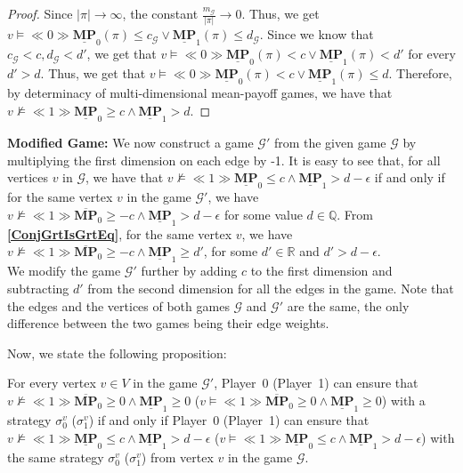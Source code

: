 \begin{proof}
    Since $|\pi| \to \infty$, the constant $\frac{m_\mathcal{G}}{|\pi|} \to 0$. Thus, we get $v \models \ll 0 \gg \underline{\mathbf{MP}}_0(\pi) \leqslant c_\mathcal{G} \lor \underline{\mathbf{MP}}_1(\pi) \leqslant d_\mathcal{G}$. Since we know that $c_\mathcal{G} < c, d_\mathcal{G} < d'$, we get that $v \models \ll 0 \gg \underline{\mathbf{MP}}_0(\pi) < c \lor \underline{\mathbf{MP}}_1(\pi) < d'$ for every $d' > d$. Thus, we get that  $v \models \ll 0 \gg \underline{\mathbf{MP}}_0(\pi) < c \lor \underline{\mathbf{MP}}_1(\pi) \leqslant d$. Therefore, by determinacy of multi-dimensional mean-payoff games, we have that $v \nvDash \ll 1 \gg \underline{\mathbf{MP}}_0 \geqslant c \land \underline{\mathbf{MP}}_1 > d$.
\end{proof}

\textbf{Modified Game:} We now construct a game $\mathcal{G'}$ from the given game $\mathcal{G}$ by multiplying the first dimension on each edge by -1. It is easy to see that, for all vertices $v$ in $\mathcal{G}$, we have that $v \nvDash \ll 1 \gg \underline{\mathbf{MP}}_0 \leqslant c \land \underline{\mathbf{MP}}_1 > d-\epsilon$ if and only if for the same vertex $v$ in the game $\mathcal{G'}$, we have $v \nvDash \ll 1 \gg \overline{\mathbf{MP}}_0 \geqslant -c \land \underline{\mathbf{MP}}_1 > d-\epsilon$ for some value $d \in \mathbb{Q}$. From \textbf{\cref{ConjGrtIsGrtEq}}, for the same vertex $v$, we have $v \nvDash \ll 1 \gg \overline{\mathbf{MP}}_0 \geqslant -c \land \underline{\mathbf{MP}}_1 \geqslant d'$, for some $d' \in \mathbb{R}$ and $d' > d - \epsilon$. \\ \noindent
We modify the game $\mathcal{G'}$ further by adding $c$ to the first dimension and subtracting $d'$ from the second dimension for all the edges in the game. Note that the edges and the vertices of both games $\mathcal{G}$ and $\mathcal{G'}$ are the same, the only difference between the two games being their edge weights.

\noindent Now, we state the following proposition:
\begin{proposition}
    \label{PropGamStrEqNewGamStr}
    For every vertex $v \in V$ in the game $\mathcal{G'}$, Player~0 (Player~1) can ensure that $v \nvDash \ll 1 \gg \overline{\mathbf{MP}}_0 \geqslant 0 \land \underline{\mathbf{MP}}_1 \geqslant 0$ ($v \models \ll 1 \gg \overline{\mathbf{MP}}_0 \geqslant 0 \land \underline{\mathbf{MP}}_1 \geqslant 0$) with a strategy $\sigma_0^{v}$ ($\sigma_1^{v}$) if and only if Player~0 (Player~1) can ensure that $v \nvDash \ll 1 \gg \underline{\mathbf{MP}}_0 \leqslant c \land \underline{\mathbf{MP}}_1 > d-\epsilon$ ($v \models \ll 1 \gg \underline{\mathbf{MP}}_0 \leqslant c \land \underline{\mathbf{MP}}_1 > d-\epsilon$) with the same strategy $\sigma_0^{v}$ ($\sigma_1^{v}$) from vertex $v$ in the game $\mathcal{G}$.
\end{proposition}

